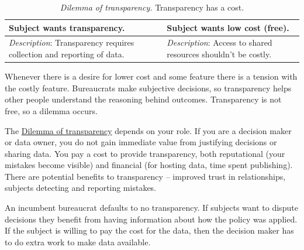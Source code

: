\begin{center}
\begin{table}[H] %
\begin{tabular}{ | m{\dilemmatablewidth}| m{\dilemmatablewidth} | } 
  \hline
  \textbf{Subject wants transparency.} &
  \textbf{Subject wants low cost (free).} \\
  \hline
  \textit{Description}: Transparency requires collection and reporting of data. & 
  \textit{Description}: Access to shared resources shouldn't be costly. \\
  \hline
\end{tabular}
\caption{\textit{Dilemma of transparency.}
Transparency has a cost.
}
\label{table:dilemma-subject-transparency}
\end{table}
\end{center}

Whenever there is a desire for lower cost and some feature there is a tension with the costly feature. Bureaucrats make subjective decisions, so transparency helps other people understand the reasoning behind outcomes. Transparency is not free, so a dilemma occurs. 


The \hyperref[table:dilemma-subject-transparency]{Dilemma of transparency} depends on your role. If you are a decision maker or data owner, you do not gain immediate value from justifying decisions or sharing data. You pay a cost to provide transparency, both reputational (your mistakes become visible) and financial (for hosting data, time spent publishing). There are potential benefits to transparency -- improved trust in relationships, subjects detecting and reporting mistakes. 

An incumbent bureaucrat defaults to no transparency. If subjects want to dispute decisions they benefit from having information about how the policy was applied. If the subject is willing to pay the cost for the data, then the decision maker has to do extra work to make data available.


